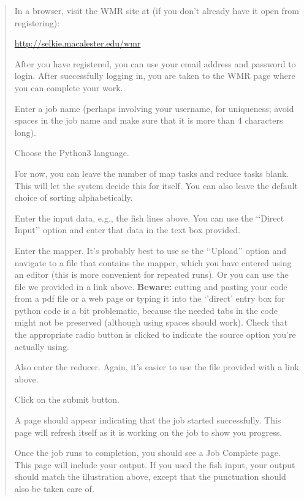 \documentclass[letterpaper,10pt,openany,oneside]{sphinxmanual}
\begin{document}
\begin{quote}

In a browser, visit the WMR site at (if you don't already have it
open from registering):

\href{http://selkie.macalester.edu/wmr}{http://selkie.macalester.edu/wmr}

After you have registered, you can use your email address and
password to login. After successfully logging in, you are taken to
the WMR page where you can complete your work.

Enter a job name (perhaps involving your username, for uniqueness;
avoid spaces in the job name and make sure that it is more than 4
characters long).

Choose the Python3 language.

For now, you can leave the number of map tasks and reduce tasks
blank. This will let the system decide this for itself. You can
also leave the default choice of sorting alphabetically.

Enter the input data, e.g., the fish lines above. You can use the
{}`{}`Direct Input'' option and enter that data in the text box
provided.

Enter the mapper. It's probably best to use se the {}`{}`Upload''
option and navigate to a file that contains the mapper, which you
have entered using an editor (this is more convenient for repeated
runs). Or you can use the file we provided in a link above.
\textbf{Beware:} cutting and pasting your code from a pdf file or
a web page or typing it into the {}`'direct' entry box for python
code is a bit problematic, because the needed tabs in the code
might not be preserved (although using spaces should work). Check
that the appropriate radio button is clicked to indicate the source
option you're actually using.

Also enter the reducer.  Again, it's easier to use the file provided
with a link above.

Click on the submit button.

A page should appear indicating that the job started successfully.
This page will refresh itself as it is working on the job to show
you progress.

Once the job runs to completion, you should see a Job Complete page.
This page will include your output. If you used the fish input,
your output should match the illustration above, except that the
punctuation should also be taken care of.
\end{quote}
\end{document}
